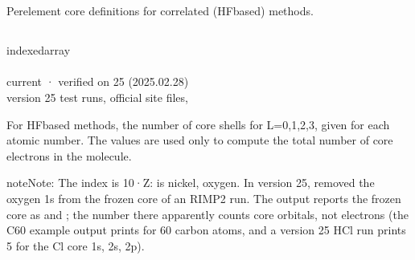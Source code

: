 \documentclass[letterpaper,10pt,english,openany,oneside]{sphinxmanual}
\begin{document}
\sphinxstepscope




\section{}
\label{\detokenize{reference/atoms:atoms}}\label{\detokenize{reference/atoms:group-atoms}}\label{\detokenize{reference/atoms::doc}}
\ignorespaces 
\sphinxAtStartPar
Per\sphinxhyphen{}element core definitions for correlated (HF\sphinxhyphen{}based) methods.


\subsection{}
\label{\detokenize{reference/atoms:core}}\label{\detokenize{reference/atoms:atoms-core}}
\ignorespaces 
\sphinxAtStartPar
{} indexed\sphinxhyphen{}array\\
 \\
 current · verified on 25 (2025.02.28)\\
 version 25 test runs, official site files, 

\sphinxAtStartPar
For HF\sphinxhyphen{}based methods, the number of core shells for L=0,1,2,3, given for each atomic number. The values are
used only to compute the total number of core electrons in the molecule.

\begin{sphinxadmonition}{note}{Note:}
\sphinxAtStartPar
The index is 10·Z:  is nickel,  oxygen. In version 25,  removed the
oxygen 1s from the frozen core of an RI\sphinxhyphen{}MP2 run. The output reports the frozen core as 
and ; the number there apparently counts core orbitals, not electrons (the C60
example output prints  for 60 carbon atoms, and a version 25 HCl run prints 5
for the Cl core 1s, 2s, 2p).
\end{sphinxadmonition}
\end{document}
